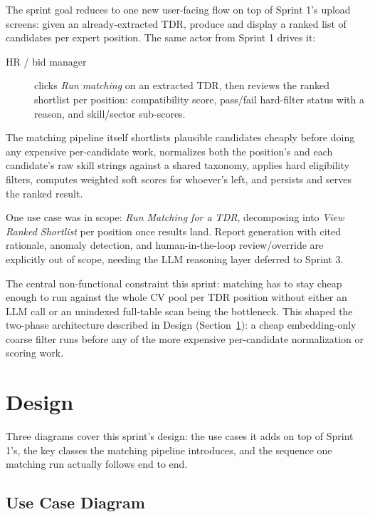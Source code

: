 The sprint goal reduces to one new user-facing flow on top of Sprint 1's
upload screens: given an already-extracted TDR, produce and display a
ranked list of candidates per expert position. The same actor from
Sprint 1 drives it:

\begin{description}
  \item[HR / bid manager] clicks \emph{Run matching} on an extracted TDR,
    then reviews the ranked shortlist per position: compatibility
    score, pass/fail hard-filter status with a reason, and skill/sector
    sub-scores.
\end{description}

The matching pipeline itself shortlists plausible candidates cheaply
before doing any expensive per-candidate work, normalizes both the
position's and each candidate's raw skill strings against a shared
taxonomy, applies hard eligibility filters, computes weighted soft
scores for whoever's left, and persists and serves the ranked result.

One use case was in scope: \emph{Run Matching for a TDR}, decomposing
into \emph{View Ranked Shortlist} per position once results land. Report
generation with cited rationale, anomaly detection, and human-in-the-loop
review/override are explicitly out of scope, needing the LLM reasoning
layer deferred to Sprint 3.

The central non-functional constraint this sprint: matching has to stay
cheap enough to run against the whole CV pool per TDR position without
either an LLM call or an unindexed full-table scan being the bottleneck.
This shaped the two-phase architecture described in Design
(Section~\ref{sec:s2-design}): a cheap embedding-only coarse filter runs
before any of the more expensive per-candidate normalization or scoring
work.

\section{Design}
\label{sec:s2-design}

Three diagrams cover this sprint's design: the use cases it adds on top
of Sprint 1's, the key classes the matching pipeline introduces, and the
sequence one matching run actually follows end to end.

\subsection{Use Case Diagram}

